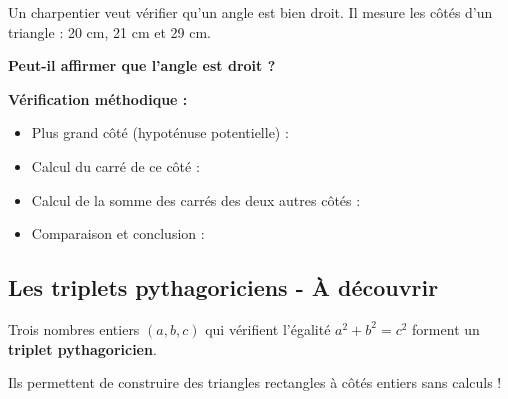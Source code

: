 \begin{exercisebox}
	\hfill
	\parbox{0.7\textwidth}{
		Un charpentier veut vérifier qu'un angle est bien droit. Il mesure les côtés d'un triangle : 20 cm, 21 cm et 29 cm.

		\textbf{Peut-il affirmer que l'angle est droit ?}
	}
	
	\vspace{0.5cm}
	\textbf{Vérification méthodique :}
	\begin{itemize}
		\item Plus grand côté (hypoténuse potentielle) : \dotfill
		\item Calcul du carré de ce côté : \dotfill
		\item Calcul de la somme des carrés des deux autres côtés : \dotfill
		\item Comparaison et conclusion : \dotfill
	\end{itemize}
\end{exercisebox}

\subsection{Les triplets pythagoriciens - À découvrir}

\begin{definitionbox}
	Trois nombres entiers $(a, b, c)$ qui vérifient l'égalité $a^2 + b^2 = c^2$ forment un \textbf{triplet pythagoricien}.
	
	Ils permettent de construire des triangles rectangles à côtés entiers sans calculs !
\end{definitionbox}

